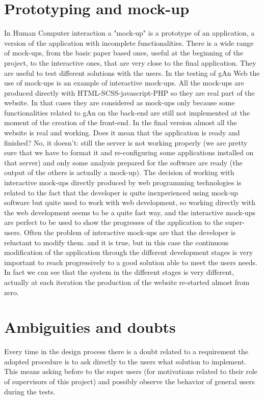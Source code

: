 \section{Prototyping and mock-up}
In Human Computer interaction a "mock-up" is a prototype of an application, a version of the application with incomplete functionalities. There is a wide range of mock-ups, from the basic paper based ones, useful at the beginning of the project, to the interactive ones, that are very close to the final application. They are useful to test different solutions with the users.
In the testing of gAn Web the use of mock-ups is an example of interactive mock-ups. All the mock-ups are produced directly with HTML-SCSS-javascript-PHP so they are real part of the website. In that cases they are considered as mock-ups only because some functionalities related to gAn on the back-end are still not implemented at the moment of the creation of the front-end. In the final version almost all the website is real and working. Does it mean that the application is ready and finished? No, it doesn't: still the server is not working properly (we are pretty sure that we have to format it and re-configuring some applications installed on that server) and only some analysis prepared for the software are ready (the output of the others is actually a mock-up). The decision of working with interactive mock-ups directly produced by web programming technologies is related to the fact that the developer is quite inexperienced using mock-up software but quite used to work with web development, so working directly with the web development seems to be a quite fast way, and the interactive mock-ups are perfect to be used to show the progresses of the application to the super-users.
Often the problem of interactive mock-ups are that the developer is reluctant to modify them. and it is true, but in this case the continuous modification of the application through the different development stages is very important to reach progressively to a good solution able to meet the users needs. In fact we can see that the system in the different stages is very different, actually at each iteration the production of the website re-started almost from zero. 

\section{Ambiguities and doubts}
Every time in the design process there is a doubt related to a requirement the adopted procedure is to ask directly to the users what solution to implement. This means asking before to the super users (for motivations related to their role of supervisors of this project) and possibly observe the behavior of general 
users during the tests.

